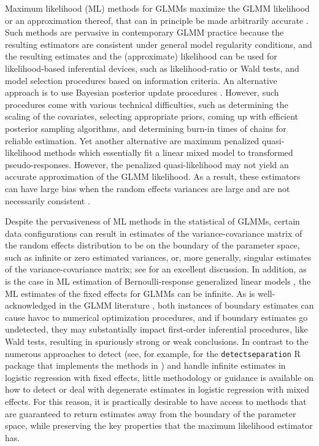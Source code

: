 \documentclass[11pt, a4paper]{article}
\theoremstyle{example} \newtheorem{example}{Example}[section]
\theoremstyle{theorem} \newtheorem{theorem}{Theorem}[section]
\begin{document}
Maximum likelihood (ML) methods for GLMMs maximize the GLMM likelihood or
an approximation thereof, that can in principle be made
arbitrarily accurate \citep[see, for example,
][]{raudenbush+etal:2000, pinheiro+chao:2006}. Such methods are
pervasive in contemporary GLMM practice because the resulting
estimators are consistent under general model regularity conditions,
and the resulting estimates and the (approximate) likelihood can be used for
 likelihood-based inferential devices, such as
likelihood-ratio or Wald tests, and model selection procedures based
on information criteria. An alternative approach is to use Bayesian
posterior update procedures \citep[see, for
example,][]{zhao+etal:2006,browne+draper:2006}. However, such
procedures come with various technical difficulties, such as
determining the scaling of the covariates, selecting appropriate
priors, coming up with efficient posterior sampling algorithms, and
determining burn-in times of chains for reliable estimation. Yet
another alternative are maximum penalized
quasi-likelihood methods \citep{schall:1991, wolfinger+oconnel:1993,
  breslow+clayton:1993} which essentially fit a linear mixed model to
transformed pseudo-responses. However, the penalized quasi-likelihood
may not yield an accurate approximation of the GLMM likelihood. As a
result, these estimators can have large bias when the random
effects variances are large
\citep{bolker+etal:2009,rodriguez+goldman1995} and are not necessarily
consistent \citep[Chapter 3.1]{jiang:2017}.

Despite the pervasiveness of ML methods in the statistical of GLMMs,
certain data configurations can result in estimates of the
variance-covariance matrix of the random effects distribution to be on
the boundary of the parameter space, such as infinite or zero
estimated variances, or, more generally, singular estimates of the
variance-covariance matrix; see \citet[Section 2.1]{chung+etal:2013}
for an excellent discussion. In addition, as is the case in ML
estimation of Bernoulli-response generalized linear models
\citep[GLMs; see, for example][Chapter 4]{mccullagh+nelder:1989}, the
ML estimates of the fixed effects for GLMMs can be infinite. As is
well-acknowledged in the GLMM literature \citep[see, for
example][]{bolker+etal:2009, bolker:2018, pasch+etal:2013}, both
instances of boundary estimates can cause havoc to numerical
optimization procedures, and if boundary estimates go undetected, they
may substantially impact first-order inferential procedures, like Wald
tests, resulting in spuriously strong or weak conclusions. In contrast
to the numerous approaches to detect (see, for example,
\citealt{kosmidis+schumacher:2021} for the \texttt{detectseparation} R
\citep{R} package that implements the methods in \citealt{konis:2017})
and handle \citep[see, for example,][]{kosmidis+firth:2021,
  heinze+schemper:2002, gelman+etal:2008} infinite estimates in
logistic regression with fixed effects, little methodology or guidance
is available on how to detect or deal with degenerate estimates in
logistic regression with mixed effects. For this reason, it is
practically desirable to have access to methods that are guaranteed to
return estimates away from the boundary of the parameter space, while
preserving the key properties that the maximum likelihood estimator
has.
\end{document}
